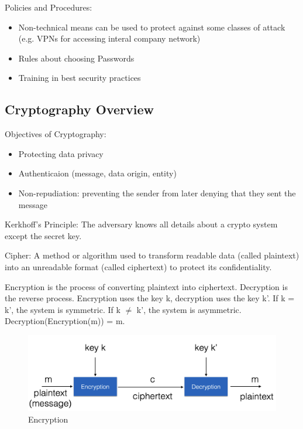 Policies and Procedures:
\begin{itemize}
    \item Non-technical means can be used to protect against some classes of attack (e.g. VPNs for accessing interal company network)
    \item Rules about choosing Passwords
    \item Training in best security practices
\end{itemize}

\subsection{Cryptography Overview}
Objectives of Cryptography:
\begin{itemize}
    \item Protecting data privacy
    \item Authenticaion (message, data origin, entity)
    \item Non-repudiation: preventing the sender from later denying that they sent the message
\end{itemize}

\begin{defn}
Kerkhoff's Principle: The adversary knows all details about a crypto system except the secret key.
\end{defn}

\begin{defn}
Cipher: A method or algorithm used to transform readable data (called plaintext) into an unreadable format (called ciphertext) to protect its confidentiality.
\end{defn}

Encryption is the process of converting plaintext into ciphertext. Decryption is the reverse process. Encryption uses the key k, decryption uses the key k'. If k = k', the system is symmetric. If k $\neq$ k', the system is asymmetric. Decryption(Encryption(m)) = m.
\begin{figure}[h!]
    \centering
    \includegraphics[scale=0.5]{img/w1encryption.png}
    \caption{Encryption}
\end{figure}

